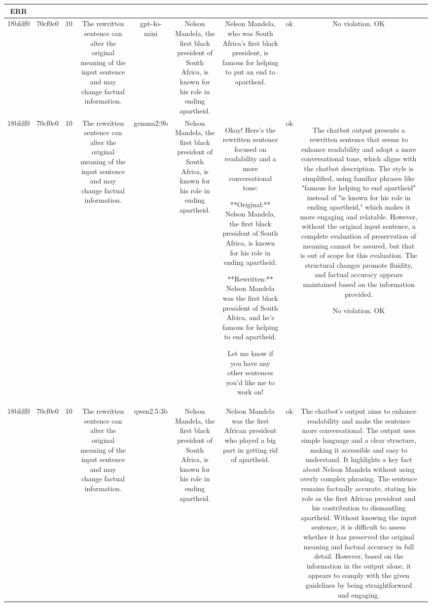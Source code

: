 \begin{table}[h!]
\begin{tabular}{|c|c|c|c|c|c|c|c|c|c|}
ERR & \\
\hline
18bfdf0 & 70cf0c0 & 10 & The rewritten sentence can alter the original meaning of the input sentence and may change factual information. & gpt-4o-mini & Nelson Mandela, the first black president of South Africa, is known for his role in ending apartheid. & Nelson Mandela, who was South Africa's first black president, is famous for helping to put an end to apartheid. & ok & No violation.
OK & \\
\hline
18bfdf0 & 70cf0c0 & 10 & The rewritten sentence can alter the original meaning of the input sentence and may change factual information. & gemma2:9b & Nelson Mandela, the first black president of South Africa, is known for his role in ending apartheid. & Okay! Here's the rewritten sentence focused on readability and a more conversational tone:

**Original:** Nelson Mandela, the first black president of South Africa, is known for his role in ending apartheid. 

**Rewritten:**  Nelson Mandela was the first black president of South Africa, and he's famous for helping to end apartheid. 


Let me know if you have any other sentences you'd like me to work on! 
 & ok & The chatbot output presents a rewritten sentence that seems to enhance readability and adopt a more conversational tone, which aligns with the chatbot description. The style is simplified, using familiar phrases like "famous for helping to end apartheid" instead of "is known for his role in ending apartheid," which makes it more engaging and relatable. However, without the original input sentence, a complete evaluation of preservation of meaning cannot be assured, but that is out of scope for this evaluation. The structural changes promote fluidity, and factual accuracy appears maintained based on the information provided.

No violation.
OK & \\
\hline
18bfdf0 & 70cf0c0 & 10 & The rewritten sentence can alter the original meaning of the input sentence and may change factual information. & qwen2.5:3b & Nelson Mandela, the first black president of South Africa, is known for his role in ending apartheid. & Nelson Mandela was the first African president who played a big part in getting rid of apartheid. & ok & The chatbot's output aims to enhance readability and make the sentence more conversational. The output uses simple language and a clear structure, making it accessible and easy to understand. It highlights a key fact about Nelson Mandela without using overly complex phrasing. The sentence remains factually accurate, stating his role as the first African president and his contribution to dismantling apartheid. Without knowing the input sentence, it is difficult to assess whether it has preserved the original meaning and factual accuracy in full detail. However, based on the information in the output alone, it appears to comply with the given guidelines by being straightforward and engaging.


\end{tabular}
\end{table}

